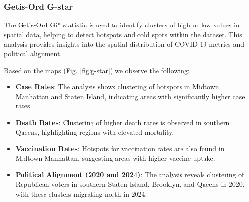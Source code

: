 \documentclass[10pt,journal,compsoc]{IEEEtran}
\begin{document}
\subsubsection{Getis-Ord G-star}

The Getis-Ord Gi* statistic is used to identify clusters of high or low values in spatial data, helping to detect hotspots and cold spots within the dataset. This analysis provides insights into the spatial distribution of COVID-19 metrics and political alignment.

Based on the maps (Fig. \ref{fig:g-star}) we observe the following:
\begin{itemize}
    \item \textbf{Case Rates}: The analysis shows clustering of hotspots in Midtown Manhattan and Staten Island, indicating areas with significantly higher case rates.
    \item \textbf{Death Rates}: Clustering of higher death rates is observed in southern Queens, highlighting regions with elevated mortality.
    \item \textbf{Vaccination Rates}: Hotspots for vaccination rates are also found in Midtown Manhattan, suggesting areas with higher vaccine uptake.
    \item \textbf{Political Alignment (2020 and 2024)}: The analysis reveals clustering of Republican voters in southern Staten Island, Brooklyn, and Queens in 2020, with these clusters migrating north in 2024.
\end{itemize}
\end{document}
